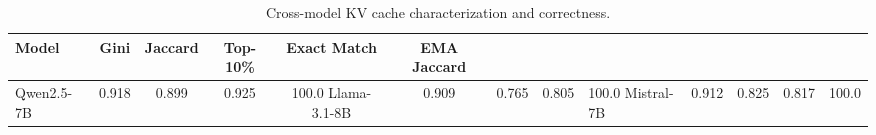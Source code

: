 \begin{table}[t]
\centering
\caption{Cross-model KV cache characterization and correctness.}
\label{tab:cross-model}
\begin{tabular}{lccccc}
\toprule
Model & Gini & Jaccard & Top-10\% & Exact Match & EMA Jaccard \\
\midrule
Qwen2.5-7B & 0.918 & 0.899 & 0.925 & 100.0%
Llama-3.1-8B & 0.909 & 0.765 & 0.805 & 100.0%
Mistral-7B & 0.912 & 0.825 & 0.817 & 100.0%
\bottomrule
\end{tabular}
\end{table}
